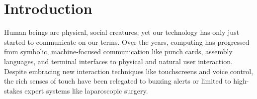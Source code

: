 
\chapter{Introduction}
\label{ch:introduction}
Human beings are physical, social creatures, yet our technology has only just started to communicate on our terms.
Over the years, computing has progressed from symbolic, machine-focused communication like punch cards, assembly languages, and terminal interfaces to physical and natural user interaction.
Despite embracing new interaction techniques like touchscreens and voice control, the rich senses of touch have been relegated to buzzing alerts or limited to high-stakes expert systems like laparoscopic surgery.

